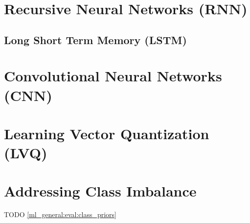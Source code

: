 \section{Recursive Neural Networks (RNN)}
\label{class:RNN}

\subsection{Long Short Term Memory (LSTM)}
\label{class:RNN:LSTM}

\section{Convolutional Neural Networks (CNN)}
\label{class:CNN}

\section{Learning Vector Quantization (LVQ)}
\label{class:kNN:LVQ}

\section{Addressing Class Imbalance}
\label{class:imbalance}

TODO \cref{ml_general:eval:class_priors}

